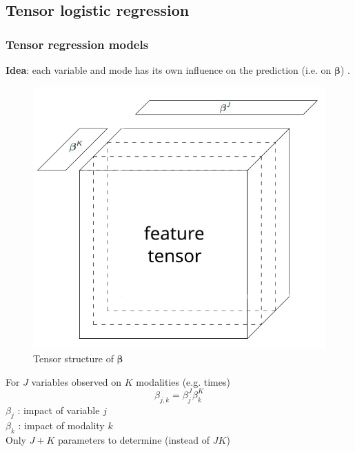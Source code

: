 \documentclass{beamer}
\begin{document}
\subsection{Tensor logistic regression}
\begin{frame}
    \frametitle{Tensor regression models}
    \textbf{Idea}: each variable and mode has its own influence on the prediction (i.e. on $\bm{\beta}$) \cite{multi_rank_1}.\\[10 pt]
    \begin{overprint}
    \begin{figure}
        \centering
        \includegraphics[scale = 0.3]{images/beta_tens.png}
        \caption{Tensor structure of $\bm{\beta}$}
    \end{figure}
    \vspace{10 pt}
    For $J$ variables observed on $K$ modalities (e.g. times)
    $$\beta_{j,k} = \beta_j^J\beta_{k}^{K}$$
    $\beta_j$ : impact of variable $j$\\[5 pt]
    $\beta_k$ : impact of modality $k$\\[10 pt]
    Only $J+K$ parameters to determine (instead of $JK$)
    
\end{overprint}
\end{frame}
\end{document}
